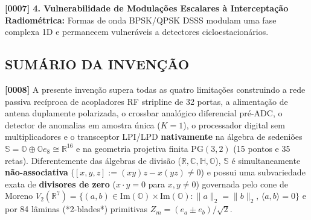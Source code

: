 \documentclass[12pt,a4paper]{article}
\begin{document}
\textbf{[0007] 4. Vulnerabilidade de Modula\c{c}\~oes Escalares \`a Intercepta\c{c}\~ao Radiom\'etrica:} Formas de onda BPSK/QPSK DSSS modulam uma fase complexa 1D e permanecem vulner\'aveis a detectores cicloestacion\'arios.

\subsection*{SUM\'ARIO DA INVEN\c{C}\~AO}
\textbf{[0008]} A presente inven\c{c}\~ao supera todas as quatro limita\c{c}\~oes construindo a rede passiva rec\'iproca de acopladores RF stripline de 32 portas, a alimenta\c{c}\~ao de antena duplamente polarizada, o crossbar anal\'ogico diferencial pr\'e-ADC, o detector de anomalias em amostra \'unica ($K=1$), o processador digital sem multiplicadores e o transceptor LPI/LPD \textbf{nativamente} na \'algebra de sedeni\~oes $\mathbb{S} = \mathbb{O} \oplus \mathbb{O}e_8 \cong \mathbb{R}^{16}$ e na geometria projetiva finita $\mathrm{PG}(3,2)$ (15 pontos e 35 retas). Diferentemente das \'algebras de divis\~ao ($\mathbb{R}, \mathbb{C}, \mathbb{H}, \mathbb{O}$), $\mathbb{S}$ \'e simultaneamente \textbf{n\~ao-associativa} ($[x,y,z] := (xy)z - x(yz) \neq 0$) e possui uma subvariedade exata de \textbf{divisores de zero} ($x \cdot y = 0$ para $x,y \neq 0$) governada pelo cone de Moreno $V_2(\mathbb{R}^7) = \{(a,b) \in \mathrm{Im}(\mathbb{O})\times\mathrm{Im}(\mathbb{O}) : \|a\|_2 = \|b\|_2,\, \langle a,b\rangle = 0\}$ e por 84 l\^aminas (*2-blades*) primitivas $Z_m = (e_a \pm e_b)/\sqrt{2}$.
\end{document}
